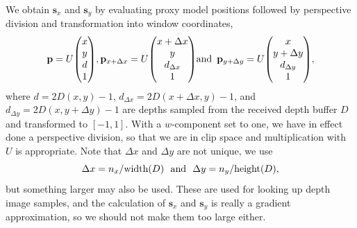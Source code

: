 \documentclass[10pt,conference,compsocconf]{IEEEtran}
\newcommand{\pv}{\mathbf{p}}
\newcommand{\sv}{\mathbf{s}}
\begin{document}
%
We obtain $\sv_{x}$ and $\sv_{y}$ by evaluating proxy model positions followed by 
perspective division and transformation into window coordinates,
\[
  \pv =
  U { \small \begin{pmatrix} x \\ y \\ d \\ 1 \end{pmatrix} },
  \pv_{x+\Delta x} =
  U { \small \begin{pmatrix} x+\Delta x \\ y \\ d_{\Delta x} \\ 1 \end{pmatrix} }
  \text{and}\, \, \, 
  \pv_{y+\Delta y} =
  U { \small \begin{pmatrix} x \\ y+\Delta y \\ d_{\Delta y} \\ 1 \end{pmatrix} },
\]
where $d = 2D(x, y) - 1$, $d_{\Delta x} =
2D(x+\Delta x, y) - 1$, and $d_{\Delta y} = 2D(x,
y+\Delta y) - 1$ are depths sampled from the received depth buffer
$D$ and transformed to $[-1, 1]$. With a
$w$-component set to one, we have in effect done a perspective division, so that
we are in clip space and multiplication with $U$ is appropriate.
%
Note that $\Delta x$ and $\Delta y$ are not unique, we use
\[
  \Delta x = n_x / \text{width}(D) \text{\,\,\,\,and\,\,\,\,}
  \Delta y = n_y / \text{height}(D),
\]
but something larger may also be used. These are used for looking up depth image
samples, and the calculation of $\sv_x$ and $\sv_y$ is really a gradient
approximation, so we should not make them too large either.
\end{document}
